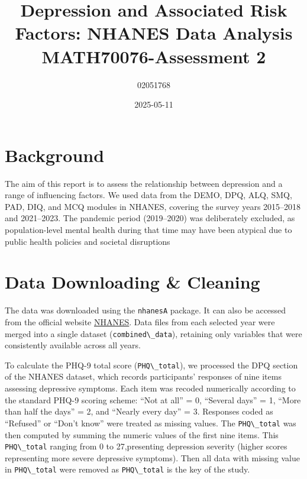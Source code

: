 \documentclass[
  11pt,
]{article}
\title{Depression and Associated Risk Factors: NHANES Data Analysis MATH70076-Assessment 2}
\author{02051768}
\date{2025-05-11}
\newcommand{\passthrough}[1]{#1}
\begin{document}
\maketitle

{
\hypersetup{linkcolor=}
\setcounter{tocdepth}{2}
\tableofcontents
}
\newpage

\section{Background}\label{background}

The aim of this report is to assess the relationship between depression and a range of influencing factors. We used data from the DEMO, DPQ, ALQ, SMQ, PAD, DIQ, and MCQ modules in NHANES, covering the survey years 2015--2018 and 2021--2023. The pandemic period (2019--2020) was deliberately excluded, as population-level mental health during that time may have been atypical due to public health policies and societal disruptions

\section{Data Downloading \& Cleaning}\label{data-downloading-cleaning}

The data was downloaded using the \passthrough{\lstinline!nhanesA!} package. It can also be accessed from the official website \href{https://wwwn.cdc.gov/nchs/nhanes/}{NHANES}. Data files from each selected year were merged into a single dataset (\passthrough{\lstinline!combined\_data!}), retaining only variables that were consistently available across all years.

To calculate the PHQ-9 total score (\passthrough{\lstinline!PHQ\_total!}), we processed the DPQ section of the NHANES dataset, which records participants' responses of nine items assessing depressive symptoms. Each item was recoded numerically according to the standard PHQ-9 scoring scheme: ``Not at all'' = 0, ``Several days'' = 1, ``More than half the days'' = 2, and ``Nearly every day'' = 3. Responses coded as ``Refused'' or ``Don't know'' were treated as missing values. The \passthrough{\lstinline!PHQ\_total!} was then computed by summing the numeric values of the first nine items. This \passthrough{\lstinline!PHQ\_total!} ranging from 0 to 27,presenting depression severity (higher scores representing more severe depressive symptoms). Then all data with missing value in \passthrough{\lstinline!PHQ\_total!} were removed as \passthrough{\lstinline!PHQ\_total!} is the key of the study.
\end{document}
